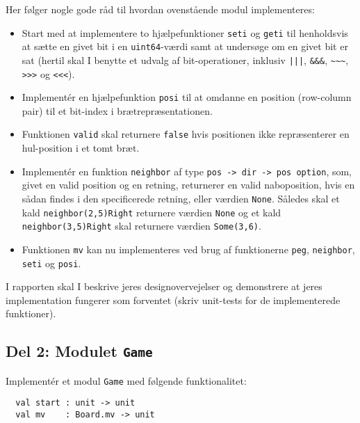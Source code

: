 Her følger nogle gode råd til hvordan ovenstående modul implementeres:
\begin{itemize}

\item Start med at implementere to hjælpefunktioner \lstinline{seti} og \lstinline{geti}
til henholdsvis at sætte en givet bit i en \lstinline{uint64}-værdi
samt at undersøge om en givet bit er sat (hertil skal I benytte et
udvalg af bit-operationer,
inklusiv \lstinline{|||}, \lstinline{&&&}, \lstinline{~~~}, \lstinline{>>>}
og \lstinline{<<<}).

\item Implementér en hjælpefunktion \lstinline{posi} til at omdanne en
position (row-column pair) til et bit-index i brætrepræsentationen.

\item Funktionen \lstinline{valid} skal returnere \lstinline{false} hvis positionen ikke repræsenterer en hul-position i et tomt bræt.
\item Implementér en funktion \lstinline{neighbor} af type \lstinline{pos -> dir -> pos option}, som, givet en valid position og en retning, returnerer en valid naboposition, hvis en sådan findes i den specificerede retning, eller værdien \lstinline{None}. Således skal et kald \lstinline{neighbor(2,5)Right} returnere værdien \lstinline{None} og et kald \lstinline{neighbor(3,5)Right} skal returnere værdien \lstinline{Some(3,6)}.
\item Funktionen \lstinline{mv} kan nu implementeres ved brug af funktionerne \lstinline{peg}, \lstinline{neighbor}, \lstinline{seti} og \lstinline{posi}.
\end{itemize}

I rapporten skal I beskrive jeres designovervejelser og demonstrere at
jeres implementation fungerer som forventet (skriv unit-tests for de
implementerede funktioner).

\subsection*{Del 2: Modulet \lstinline{Game}}

Implementér et modul \lstinline{Game} med følgende funktionalitet:
\begin{lstlisting}
  val start : unit -> unit
  val mv    : Board.mv -> unit
\end{lstlisting}

